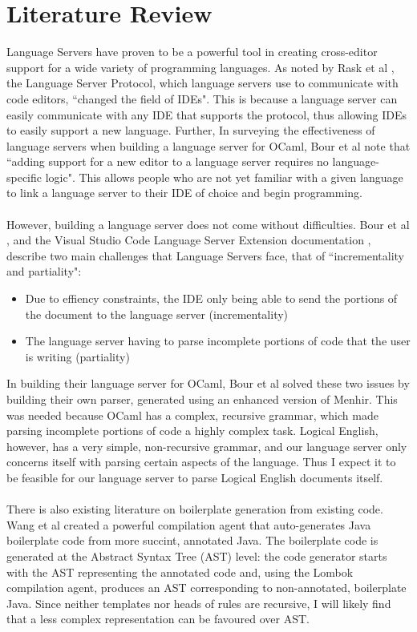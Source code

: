 \documentclass[../main.tex]{subfiles}
\begin{document}
\section*{Literature Review}

Language Servers have proven to be a powerful tool in creating cross-editor support for a wide variety of programming languages. As noted by Rask et al \cite[]{standardised_lsp_extensions}, the Language Server Protocol, which language servers use to communicate with code editors, ``changed the field of IDEs". This is because a language server can easily communicate with any IDE that supports the protocol, thus allowing IDEs to easily support a new language. Further, In surveying the effectiveness of language servers when building a language server for OCaml, Bour et al \cite[]{merlin_experience_report} note that ``adding support for a new editor to a language server requires no language-specific logic". This allows people who are not yet familiar with a given language to link a language server to their IDE of choice and begin programming. 
\\ \\
However, building a language server does not come without difficulties. Bour et al \cite[]{merlin_experience_report}, and the Visual Studio Code Language Server Extension documentation \cite[]{vsc_langserver_docs}, describe two main challenges that Language Servers face, that of ``incrementality and partiality":
\begin{itemize}
    \item Due to effiency constraints, the IDE only being able to send the portions of the document to the language server (incrementality)
    \item The language server having to parse incomplete portions of code that the user is writing (partiality)
\end{itemize}
In building their language server for OCaml, Bour et al solved these two issues by building their own parser, generated using an enhanced version of Menhir. This was needed because OCaml has a complex, recursive grammar, which made parsing incomplete portions of code a highly complex task. Logical English, however, has a very simple, non-recursive grammar, and our language server only concerns itself with parsing certain aspects of the language. Thus I expect it to be feasible for our language server to parse Logical English documents itself.
\\ \\
There is also existing literature on boilerplate generation from existing code. Wang et al \cite[]{classless_java} created a powerful compilation agent that auto-generates Java boilerplate code from more succint, annotated Java. The boilerplate code is generated at the Abstract Syntax Tree (AST) level: the code generator starts with the AST representing the annotated code and, using the Lombok compilation agent, produces an AST corresponding to non-annotated, boilerplate Java. Since neither templates nor heads of rules are recursive, I will likely find that a less complex representation can be favoured over AST.
\end{document}
